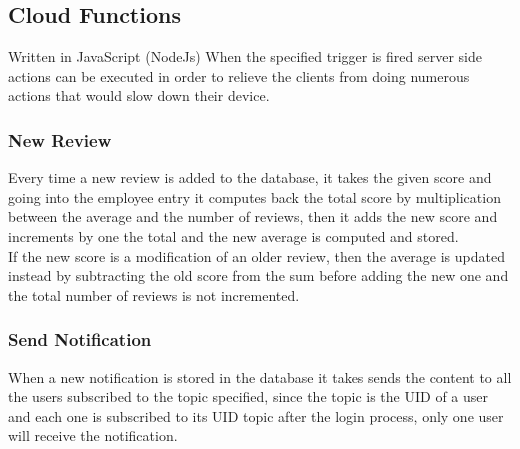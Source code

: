\subsection{Cloud Functions}
\label{App:CloudFunctions}
Written in JavaScript (NodeJs) When the specified trigger is fired server side actions can be executed in order to relieve the clients from doing numerous actions that would slow down their device.
\subsubsection{New Review}
\label{Sec:NewReview}
Every time a new review is added to the database, it takes the given score and going into the employee entry it computes back the total score by multiplication between the average and the number of reviews, then it adds the new score and increments by one the total and the new average is computed and stored.\\
If the new score is a modification of an older review, then the average is updated instead by subtracting the old score from the sum before adding the new one and the total number of reviews is not incremented.
\subsubsection{Send Notification}
\label{Sec:SendNotification}
When a new notification is stored in the database it takes sends the content to all the users subscribed to the topic specified, since the topic is the UID of a user and each one is subscribed to its UID topic after the login process, only one user will receive the notification.
\clearpage

